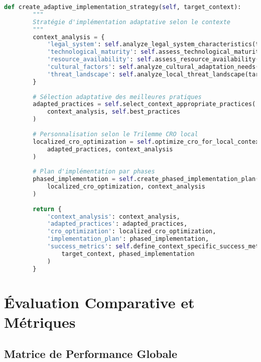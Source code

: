 \begin{lstlisting}[language=Python, caption=Framework d'excellence forensique universelle]
    def create_adaptive_implementation_strategy(self, target_context):
        """
        Stratégie d'implémentation adaptative selon le contexte
        """
        context_analysis = {
            'legal_system': self.analyze_legal_system_characteristics(target_context),
            'technological_maturity': self.assess_technological_maturity(target_context),
            'resource_availability': self.assess_resource_availability(target_context),
            'cultural_factors': self.analyze_cultural_adaptation_needs(target_context),
            'threat_landscape': self.analyze_local_threat_landscape(target_context)
        }
        
        # Sélection adaptative des meilleures pratiques
        adapted_practices = self.select_context_appropriate_practices(
            context_analysis, self.best_practices
        )
        
        # Personnalisation selon le Trilemme CRO local
        localized_cro_optimization = self.optimize_cro_for_local_context(
            adapted_practices, context_analysis
        )
        
        # Plan d'implémentation par phases
        phased_implementation = self.create_phased_implementation_plan(
            localized_cro_optimization, context_analysis
        )
        
        return {
            'context_analysis': context_analysis,
            'adapted_practices': adapted_practices,
            'cro_optimization': localized_cro_optimization,
            'implementation_plan': phased_implementation,
            'success_metrics': self.define_context_specific_success_metrics(
                target_context, phased_implementation
            )
        }
\end{lstlisting}

\section{Évaluation Comparative et Métriques}

\subsection{Matrice de Performance Globale}

